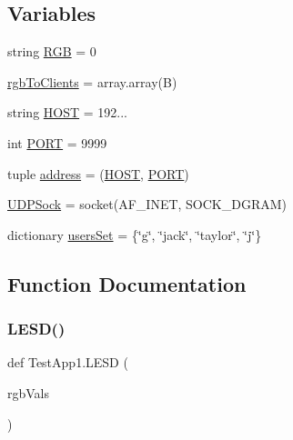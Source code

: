 \subsection*{Variables}
\begin{DoxyCompactItemize}
\item 
string \hyperlink{namespaceTestApp1_afdb7789ca8ed6dc37128b8062410c2ab}{R\+GB} = \textquotesingle{}0\textquotesingle{}
\item 
\hyperlink{namespaceTestApp1_a4b40f8b017c0288d808fb37465995c9b}{rgb\+To\+Clients} = array.\+array(\textquotesingle{}B\textquotesingle{})
\item 
string \hyperlink{namespaceTestApp1_a32675c1567f50c9219e268d339fefd25}{H\+O\+ST} = \textquotesingle{}192...\textquotesingle{}
\item 
int \hyperlink{namespaceTestApp1_a0a02ae4c9398345071f0ccdd43bc4f3d}{P\+O\+RT} = 9999
\item 
tuple \hyperlink{namespaceTestApp1_a37693e75a952244c15c4f328112913b6}{address} = (\hyperlink{namespaceTestApp1_a32675c1567f50c9219e268d339fefd25}{H\+O\+ST}, \hyperlink{namespaceTestApp1_a0a02ae4c9398345071f0ccdd43bc4f3d}{P\+O\+RT})
\item 
\hyperlink{namespaceTestApp1_a4386f942521f81813915fef86956135c}{U\+D\+P\+Sock} = socket(A\+F\+\_\+\+I\+N\+ET, S\+O\+C\+K\+\_\+\+D\+G\+R\+AM)
\item 
dictionary \hyperlink{namespaceTestApp1_a9774a750e020395749cf1405ef7a19aa}{users\+Set} = \{\char`\"{}g\char`\"{}, \char`\"{}jack\char`\"{}, \char`\"{}taylor\char`\"{}, \char`\"{}j\char`\"{}\}
\end{DoxyCompactItemize}


\subsection{Function Documentation}
\mbox{\label{namespaceTestApp1_a60e2e2ce5fa9823b4c739bc324cc7e45}} 
\subsubsection{\texorpdfstring{L\+E\+S\+D()}{LESD()}}
{\footnotesize\ttfamily def Test\+App1.\+L\+E\+SD (\begin{DoxyParamCaption}\item[{}]{rgb\+Vals }\end{DoxyParamCaption})}



